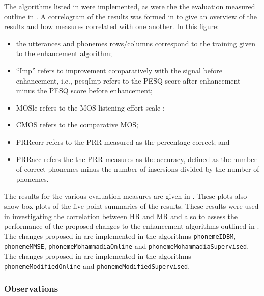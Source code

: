 The algorithms listed in  were implemented,
as were the the evaluation measured outline in .
A correlogram of the results was formed in  to give
an overview of the results and how measures correlated with one another.
In this figure:
\begin{itemize}
\item the utterances and phonemes rows/columns correspond to the training
given to the enhancement algorithm;
\item ``Imp'' refers to improvement comparatively with the signal before
enhancement, i.e., pesqImp refers to the \ac{PESQ} score after enhancement
minus the \ac{PESQ} score before enhancement;
\item MOSle refers to the \ac{MOS} listening effort scale \citep{InternationalTelecommunicationUnion1996};
\item CMOS refers to the comparative \ac{MOS};
\item PRRcorr refers to the \ac{PRR} measured as the percentage correct;
and
\item PRRacc refers the the \ac{PRR} measures as the accuracy, defined
as the number of correct phonemes minus the number of insersions divided
by the number of phonemes.
\end{itemize}
The results for the various evaluation measures are given in .
These plots also show box plots of the five-point summaries of the
results. These results were used in investigating the correlation
between \ac{HR} and \ac{MR} and also to assess the performance of
the proposed changes to the enhancement algorithms outlined in .
The changes proposed in  are implemented
in the algorithms \lstinline[breaklines=true]!phonemeIDBM!, \lstinline[breaklines=true]!phonemeMMSE!,
\lstinline[breaklines=true]!phonemeMohammadiaOnline! and \lstinline[breaklines=true]!phonemeMohammadiaSupervised!.
The changes proposed in  are implemented
in the algorithms \lstinline[breaklines=true]!phonemeModifiedOnline!
and \lstinline[breaklines=true]!phonemeModifiedSupervised!.


\subsubsection*{Observations}

